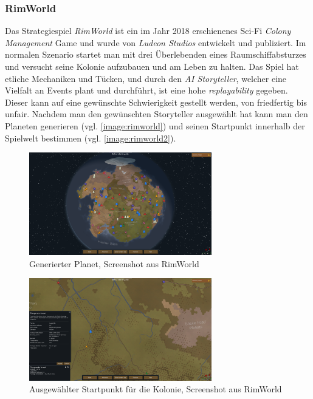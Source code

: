\subsubsection{RimWorld}
Das Strategiespiel \textit{RimWorld} ist ein im Jahr 2018 erschienenes Sci-Fi \textit{Colony Management} Game und wurde von \textit{Ludeon Studios} entwickelt und publiziert. Im normalen Szenario startet man mit drei Überlebenden eines Raumschiffabsturzes und versucht seine Kolonie aufzubauen und am Leben zu halten. Das Spiel hat etliche Mechaniken und Tücken, und durch den \textit{AI Storyteller}, welcher eine Vielfalt an Events plant und durchführt, ist eine hohe \textit{replayability} gegeben. Dieser kann auf eine gewünschte Schwierigkeit gestellt werden, von friedfertig bis unfair. Nachdem man den gewünschten Storyteller ausgewählt hat kann man den Planeten generieren (vgl. \autoref{image:rimworld}) und seinen Startpunkt innerhalb der Spielwelt bestimmen (vgl. \autoref{image:rimworld2}).

\begin{figure}
    \begin{center}
        \includegraphics[width=300px]{0.bilder/rimworld.png}
    \end{center}
    \caption{Generierter Planet, Screenshot aus RimWorld} \label{image:rimworld}
\end{figure}

\begin{figure}
    \begin{center}
        \includegraphics[width=300px]{0.bilder/rimworld2.png}
    \end{center}
    \caption{Ausgewählter Startpunkt für die Kolonie, Screenshot aus RimWorld} \label{image:rimworld2}
\end{figure}

